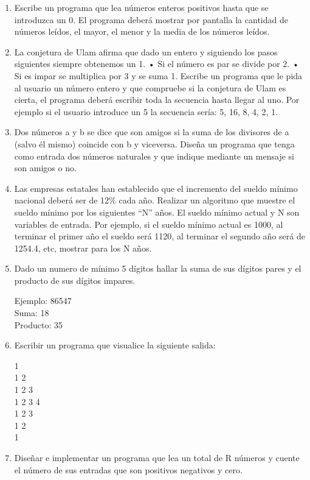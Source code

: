 \documentclass{scrartcl}
\begin{document}
\begin{enumerate}
		\item Escribe un programa que lea números enteros positivos hasta que se introduzca un 0. El programa deberá mostrar por pantalla la cantidad de números leídos, el mayor, el menor y la media de los números leídos.
		
		\item La conjetura de Ulam afirma que dado un entero y siguiendo los pasos siguientes siempre obtenemos un 1. • Si el número es par se divide por 2. • Si es impar se	multiplica por 3 y se suma 1. Escribe un programa que le pida al usuario un número	entero y que compruebe si la conjetura de Ulam es cierta, el programa deberá	escribir toda la secuencia hasta llegar al uno. Por ejemplo si el usuario introduce un	5 la secuencia sería: 5, 16, 8, 4, 2, 1.
		
		\item Dos números a y b se dice que son amigos si la suma de los divisores de a (salvo él mismo) coincide con b y viceversa. Diseña un programa que tenga como entrada dos números naturales y que indique mediante un mensaje si son amigos o no.
		
		\item Las empresas estatales han establecido que el incremento del sueldo mínimo nacional deberá ser de 12\% cada año. Realizar un algoritmo que muestre el sueldo mínimo por los siguientes “N” años. El sueldo mínimo actual y N son variables de entrada.	Por ejemplo, si el sueldo mínimo actual es 1000, al terminar el primer año el sueldo será 1120, al terminar el segundo año será de 1254.4, etc, mostrar para los N años.
		
		\item Dado un numero de mínimo 5 dígitos hallar la suma de sus dígitos pares y el
		producto de sus dígitos impares.
		
		Ejemplo: 86547 \\
		Suma: 18\\
		Producto: 35
		
		\item Escribir un programa que visualice la siguiente salida:
		
		1 \\
		1 2\\
		1 2 3\\
		1 2 3 4\\
		1 2 3\\
		1 2\\
		1\\
		
		\item Diseñar e implementar un programa que lea un total de R números y cuente el
		número de sus entradas que son positivos negativos y cero.
		

\end{enumerate}
\end{document}
